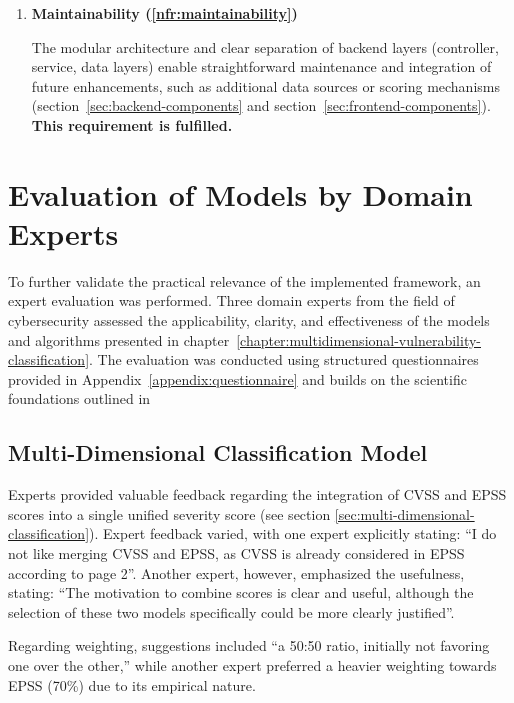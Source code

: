 \begin{enumerate}
    \item \textbf{Maintainability (\ref{nfr:maintainability})}
	      	            
    The modular architecture and clear separation of backend layers (controller, service, data layers) enable straightforward maintenance and integration of future enhancements, such as additional data sources or scoring mechanisms (section~\ref{sec:backend-components} and section~\ref{sec:frontend-components}). \textbf{This requirement is fulfilled.}
    
\end{enumerate}

\section{Evaluation of Models by Domain Experts}

To further validate the practical relevance of the implemented framework, an expert evaluation was performed. Three domain experts from the field of cybersecurity assessed the applicability, clarity, and effectiveness of the models and algorithms presented in chapter~\ref{chapter:multidimensional-vulnerability-classification}. The evaluation was conducted using structured questionnaires provided in Appendix~\ref{appendix:questionnaire} and builds on the scientific foundations outlined in %

\subsection{Multi-Dimensional Classification Model}

Experts provided valuable feedback regarding the integration of \ac{CVSS} and \ac{EPSS} scores into a single unified severity score (see section \ref{sec:multi-dimensional-classification}). Expert feedback varied, with one expert explicitly stating: \enquote{I do not like merging \ac{CVSS} and \ac{EPSS}, as \ac{CVSS} is already considered in \ac{EPSS} according to page 2}. Another expert, however, emphasized the usefulness, stating: \enquote{The motivation to combine scores is clear and useful, although the selection of these two models specifically could be more clearly justified}.

Regarding weighting, suggestions included \enquote{a 50:50 ratio, initially not favoring one over the other,} while another expert preferred a heavier weighting towards EPSS (70\%) due to its empirical nature.

